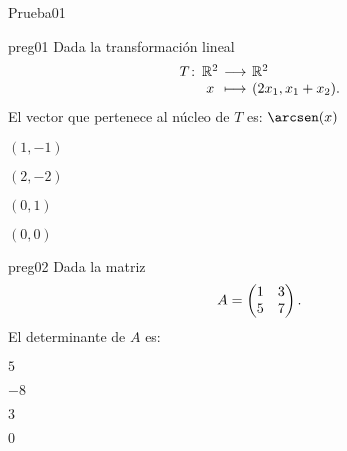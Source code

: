 \documentclass[10pt]{article}
\begin{document}
\begin{quiz}{Prueba01}

\begin{multi}{preg01}
    Dada la transformaci\'on lineal
    \[
        \funcion{T}{\R^2}{\R^2}{x}{(2x_1,x_1+x_2).}
    \]
    El vector que pertenece al n\'ucleo de $T$ es: $\arcsen(x)$
    \item $(1,-1)$
    \item $(2,-2)$
    \item $(0,1)$
    \item* $(0,0)$
\end{multi}

\begin{multi}{preg02}
    Dada la matriz 
    \[
        A=
        \begin{pmatrix}
        1&3\cr
        5&7
        \end{pmatrix}.
    \]
    El determinante de $A$ es:
    \item $5$
    \item* $-8$
    \item $3$
    \item $0$
\end{multi}

\end{quiz}
\end{document}
